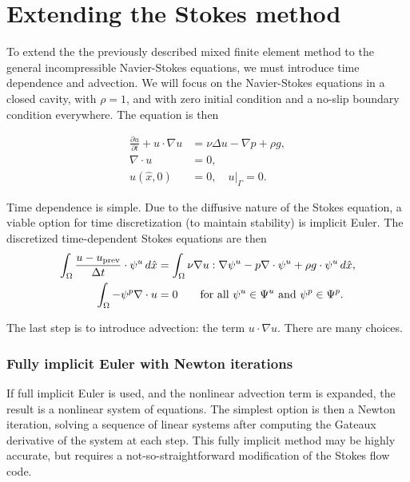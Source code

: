 \section{Extending the Stokes method}

To extend the the previously described mixed finite element method to the general incompressible Navier-Stokes equations,
we must introduce time dependence and advection. We will focus on the Navier-Stokes equations in a closed cavity, with $\rho = 1$, and with zero initial condition and
a no-slip boundary condition everywhere. The equation is then

\begin{equation}\label{navier_stokes_ibvp}
\begin{split}
    \frac{\partial u}{\partial t} + u\cdot\nabla u &= \nu\Delta u - \nabla p + \rho g,\\
    \nabla\cdot u &= 0,\\
    u(\hat{x}, 0) &= 0, \quad \left.u\right|_\Gamma = 0.
\end{split}
\end{equation}

Time dependence is simple. Due to the diffusive nature of the Stokes equation, a viable option for time discretization (to maintain stability) is implicit Euler.
The discretized time-dependent Stokes equations are then
\newcommand{\uprev}{{u_{\text{prev}}}}
\begin{equation}
\begin{split}
    \int_\om \frac{u - \uprev}{\Delta t}\cdot \psi^u\,d\hat{x}
        &= \int_\om \nu \nabla u : \nabla \psi^u - p\nabla\cdot \psi^u + \rho g \cdot \psi^u\,d\hat{x},\\
    \int_\om -\psi^p \nabla\cdot u &= 0 \text{\quad\quad for all $\psi^u \in \Psi^u$ and $\psi^p \in \Psi^p$.}
\end{split}
\end{equation}

The last step is to introduce advection: the term $u\cdot \nabla u$. There are many choices.
\subsubsection{Fully implicit Euler with Newton iterations}
If full implicit Euler is used, and the nonlinear advection term is expanded, the result is a nonlinear system of equations.
The simplest option is then a Newton iteration, solving a sequence of linear systems after computing the Gateaux derivative of the system
at each step. This fully implicit method may be highly accurate, but requires a not-so-straightforward modification of the Stokes flow code.

